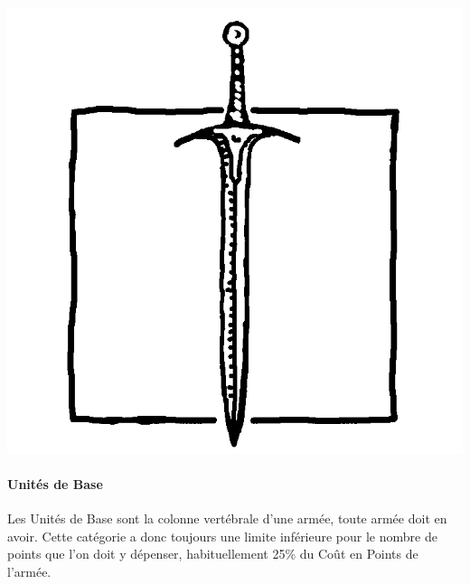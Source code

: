 \begin{minipage}[c]{0.17\textwidth}
\includegraphics[width=\textwidth]{../Layout/pics/logo_core.png}
\end{minipage}\hfill
\begin{minipage}[c]{0.80\textwidth}
\paragraph{Unités de Base}

Les Unités de Base sont la colonne vertébrale d'une armée, toute armée doit en avoir. Cette catégorie a donc toujours une limite inférieure pour le nombre de points que l'on doit y dépenser, habituellement 25\% du Coût en Points de l'armée.
\end{minipage}

